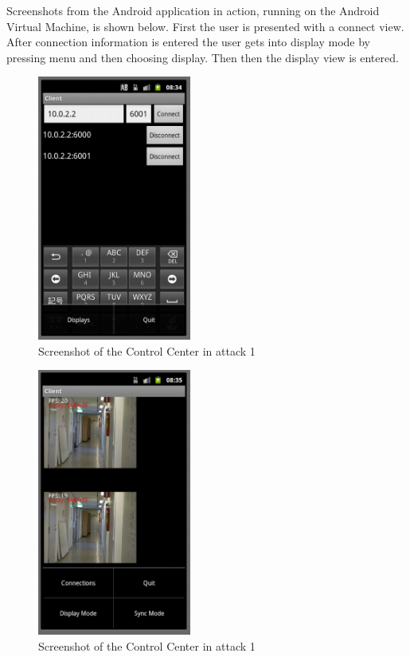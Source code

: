 \documentclass[8pt,titlepage]{article}
\begin{document}
Screenshots from the Android application in action, running on the Android Virtual Machine, is shown below. First the user is presented with a connect view. After connection information is entered the user gets into display mode by pressing menu and then choosing display. Then then the display view is entered.

\begin{figure}[hbp]
\includegraphics[width=0.45\textwidth]{../screenshots/androidConnecting.png}
\caption{Screenshot of the Control Center in attack 1}
\end{figure}


\begin{figure}[hbp]
\includegraphics[width=0.45\textwidth]{../screenshots/androidDisplaying.png}
\caption{Screenshot of the Control Center in attack 1}
\end{figure}
\end{document}
